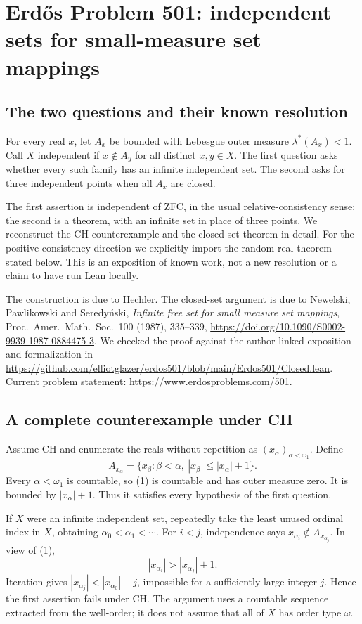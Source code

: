 \section*{Erd\H{o}s Problem 501: independent sets for small-measure set mappings}
\subsection*{The two questions and their known resolution}
For every real $x$, let $A_x$ be bounded with Lebesgue outer measure $\lambda^*(A_x)<1$. Call $X$ independent if $x\notin A_y$ for all distinct $x,y\in X$. The first question asks whether every such family has an infinite independent set. The second asks for three independent points when all $A_x$ are closed.

The first assertion is independent of ZFC, in the usual relative-consistency sense; the second is a theorem, with an infinite set in place of three points. We reconstruct the CH counterexample and the closed-set theorem in detail. For the positive consistency direction we explicitly import the random-real theorem stated below. This is an exposition of known work, not a new resolution or a claim to have run Lean locally.

The construction is due to Hechler. The closed-set argument is due to Newelski, Pawlikowski and Seredy\'nski, \emph{Infinite free set for small measure set mappings}, Proc.\ Amer.\ Math.\ Soc.\ 100 (1987), 335--339, \url{https://doi.org/10.1090/S0002-9939-1987-0884475-3}. We checked the proof against the author-linked exposition and formalization in \url{https://github.com/elliotglazer/erdos501/blob/main/Erdos501/Closed.lean}. Current problem statement: \url{https://www.erdosproblems.com/501}.

\subsection*{A complete counterexample under CH}
Assume CH and enumerate the reals without repetition as $(x_\alpha)_{\alpha<\omega_1}$. Define
\[
 A_{x_\alpha}
 =\{x_\beta:\beta<\alpha,\ |x_\beta|\le |x_\alpha|+1\}. \tag{1}
\]
Every $\alpha<\omega_1$ is countable, so (1) is countable and has outer measure zero. It is bounded by $|x_\alpha|+1$. Thus it satisfies every hypothesis of the first question.

If $X$ were an infinite independent set, repeatedly take the least unused ordinal index in $X$, obtaining
$\alpha_0<\alpha_1<\cdots$. For $i<j$, independence says $x_{\alpha_i}\notin A_{x_{\alpha_j}}$. In view of (1),
\[
 |x_{\alpha_i}|>|x_{\alpha_j}|+1.
\]
Iteration gives $|x_{\alpha_j}|<|x_{\alpha_0}|-j$, impossible for a sufficiently large integer $j$. Hence the first assertion fails under CH. The argument uses a countable sequence extracted from the well-order; it does not assume that all of $X$ has order type $\omega$.

